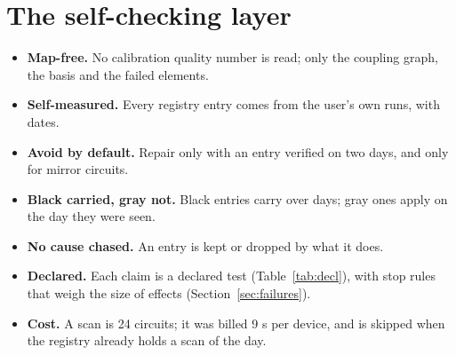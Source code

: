 \documentclass[11pt]{article}
\begin{document}
\section{The self-checking layer}\label{sec:layer}

\begin{table}[h]
\centering\small
{}
\caption{The layers used in the declared tests.}
\label{tab:layers}
\end{table}

\begin{itemize}
\item \textbf{Map-free.} No calibration quality number is read; only the coupling graph, the basis and the failed
  elements.
\item \textbf{Self-measured.} Every registry entry comes from the user's own runs, with dates.
\item \textbf{Avoid by default.} Repair only with an entry verified on two days, and only for mirror circuits.
\item \textbf{Black carried, gray not.} Black entries carry over days; gray ones apply on the day they were seen.
\item \textbf{No cause chased.} An entry is kept or dropped by what it does.
\item \textbf{Declared.} Each claim is a declared test (Table~\ref{tab:decl}), with stop rules that weigh the size of
  effects (Section~\ref{sec:failures}).
\item \textbf{Cost.} A scan is 24 circuits; it was billed 9 s per device, and is skipped when the registry already
  holds a scan of the day.
\end{itemize}
\end{document}
